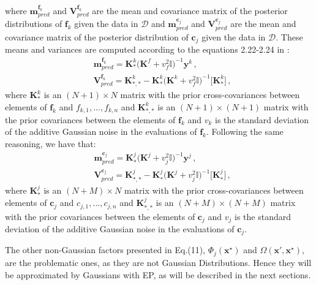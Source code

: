 where $\boldsymbol{m}_{pred}^{\boldsymbol{f}_k}$ and $\boldsymbol{V}_{pred}^{\boldsymbol{f}_k}$ are the mean and covariance matrix of the posterior distributions of $\boldsymbol{f}_k$ given the data in $\mathcal{D}$ and $\boldsymbol{m}_{pred}^{\boldsymbol{c}_j}$ and $\boldsymbol{V}_{pred}^{\boldsymbol{c}_j}$ are the mean and covariance matrix of the posterior distribution of $\boldsymbol{c}_j$ given the data in $\mathcal{D}$. These means and variances are computed according to the equations 2.22-2.24 in \citep{rasmussen2003gaussian}:
\begin{align}
    &
    \boldsymbol{m}_{pred}^{\boldsymbol{f}_{k}} = \boldsymbol{K}_{*}^{k}\big(\boldsymbol{K}^{f} + v_{f}^{2}        \mathds{I}\big)^{-1}\boldsymbol{y}^k\,, \nonumber \\
    & 
    \boldsymbol{V}_{pred}^{\boldsymbol{f}_{k}} = \boldsymbol{K}_{*,*}^{k} - \boldsymbol{K}_{*}^{k}\big(\boldsymbol{K}^{k} + v_{f}^{2}        \mathds{I}\big)^{-1}\big[\boldsymbol{K}_{*}^{k}\big]\,,
\end{align}
where $\boldsymbol{K}_{*}^{k}$ is an $(N + 1) \times N$ matrix with the prior cross-covariances between elements of $\boldsymbol{f}_k$ and $f_{k,1},...,f_{k,n}$ and $\boldsymbol{K}_{*,*}^{k}$ is an $(N + 1) \times (N + 1)$ matrix with the prior covariances between the elements of $\boldsymbol{f}_k$ and $v_k$ is the standard deviation of the additive Gaussian noise in the evaluations of $\boldsymbol{f}_k$. Following the same reasoning, we have that:
\begin{align}
    &
    \boldsymbol{m}_{pred}^{\boldsymbol{c}_{j}} = \boldsymbol{K}_{*}^{j}\big(\boldsymbol{K}^{j} + v_{j}^{2}        \mathds{I}\big)^{-1}\boldsymbol{y}^j\,, \nonumber \\
    & 
    \boldsymbol{V}_{pred}^{\boldsymbol{c}_{j}} = \boldsymbol{K}_{*,*}^{j} - \boldsymbol{K}_{*}^{j}\big(\boldsymbol{K}^{j} + v_{j}^{2}        \mathds{I}\big)^{-1}\big[\boldsymbol{K}_{*}^{j}\big]\,,
\end{align}
where $\boldsymbol{K}_{*}^{j}$ is an $(N + M) \times N$ matrix with the prior cross-covariances between elements of $\boldsymbol{c}_j$ and $c_{j,1},...,c_{j,n}$ and $\boldsymbol{K}_{*,*}^{j}$ is an $(N + M) \times (N + M)$ matrix with the prior covariances between the elements of $\boldsymbol{c}_j$ and $v_j$ is the standard deviation of the additive Gaussian noise in the evaluations of $\boldsymbol{c}_j$.

The other non-Gaussian factors presented in Eq.(11), $\Phi_j(\textbf{x}^{\star})$ and  $\Omega(\textbf{x}',\textbf{x}^{\star})$, are the problematic ones, as they are not Gaussian Distributions. Hence they will be approximated by Gaussians with EP, as will be described in the next sections.

